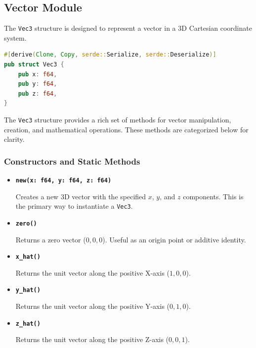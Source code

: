 \documentclass[12pt,a4paper]{article}
\begin{document}
\subsection{Vector Module}
The \texttt{Vec3} structure is designed to represent a vector in a 3D Cartesian coordinate system.
\begin{lstlisting}[language=rust, caption={\texttt{Vec3} struct}, label={lst:rust_main}]
#[derive(Clone, Copy, serde::Serialize, serde::Deserialize)]
pub struct Vec3 {
    pub x: f64,
    pub y: f64,
    pub z: f64,
}
\end{lstlisting}

The \texttt{Vec3} structure provides a rich set of methods for vector manipulation, creation, and mathematical operations. These methods are categorized below for clarity.

\subsubsection{Constructors and Static Methods}
\begin{itemize}
    \item \textbf{\texttt{new(x: f64, y: f64, z: f64)}}
    
    Creates a new 3D vector with the specified $x$, $y$, and $z$ components. This is the primary way to instantiate a \texttt{Vec3}.

    \item \textbf{\texttt{zero()}}

    Returns a zero vector (\(0, 0, 0\)). Useful as an origin point or additive identity.

    \item \textbf{\texttt{x\_hat()}}

    Returns the unit vector along the positive X-axis (\(1, 0, 0\)).

    \item \textbf{\texttt{y\_hat()}}

    Returns the unit vector along the positive Y-axis (\(0, 1, 0\)).

    \item \textbf{\texttt{z\_hat()}}

    Returns the unit vector along the positive Z-axis (\(0, 0, 1\)).
\end{itemize}
\end{document}
